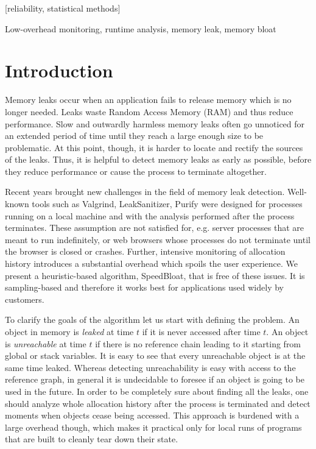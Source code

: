 \documentclass[preprint, numbers]{sigplanconf}
\begin{document}
[reliability, statistical methods]

\terms

\keywords
Low-overhead monitoring, runtime analysis, memory leak, memory bloat

\section{Introduction}

Memory leaks occur when an application fails to release memory which is no longer needed.
Leaks waste Random Access Memory (RAM) and thus reduce performance.
Slow and outwardly harmless memory leaks often go unnoticed for an extended period
of time until they reach a large enough size to be problematic.
At this point, though, it is harder to locate and rectify the sources of the leaks.
Thus, it is helpful to detect memory leaks as early as possible, before they
reduce performance or cause the process to terminate altogether.

Recent years brought new challenges in the field of memory leak detection.
Well-known tools such as Valgrind, LeakSanitizer, Purify \cite{valgrind, leak-san, purify} were designed
for processes running on a local machine and with the analysis
performed after the process terminates.
These assumption are not satisfied for, e.g. server processes
that are meant to run indefinitely, or web browsers whose processes
do not terminate until the browser is closed or crashes.
Further, intensive monitoring of allocation history
introduces a substantial overhead which spoils the user experience.
We present a heuristic-based algorithm, SpeedBloat, that is free of these issues.
It is sampling-based and therefore it works best for applications used widely
by customers.

To clarify the goals of the algorithm let us start with defining the problem.
An object in memory is \textit{leaked} at time $t$ if it is never accessed
after time $t$.
An object is \textit{unreachable} at time $t$ if there is no reference chain
leading to it starting from global or stack variables.
It is easy to see that every unreachable object is at the same time leaked.
Whereas detecting unreachability is easy with access to the reference graph,
in general it is undecidable to foresee if an object is going to be used in the future.
In order to be completely sure about finding all the leaks, one should analyze whole
allocation history after the process is terminated and detect moments when objects cease being accessed.
This approach is burdened with a large overhead though, which makes it practical only
for local runs of programs that are built to cleanly tear down their state.
\end{document}
